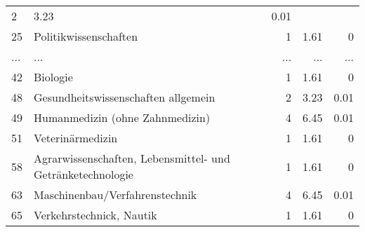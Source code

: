 \begin{longtable}{lXrrr}
          \num{2} &
          \num[round-mode=places,round-precision=2]{3,23} &
          \num[round-mode=places,round-precision=2]{0,01} \\
        25 & \multicolumn{1}{X}{Politikwissenschaften} & %
          \num{1} &
          \num[round-mode=places,round-precision=2]{1,61} &
          \num[round-mode=places,round-precision=2]{0} \\
       ... & ... & ... & ... & ... \\
        42 & \multicolumn{1}{X}{Biologie} & %
          \num{1} &
          \num[round-mode=places,round-precision=2]{1,61} &
          \num[round-mode=places,round-precision=2]{0} \\

        48 & \multicolumn{1}{X}{Gesundheitswissenschaften allgemein} & %
          \num{2} &
          \num[round-mode=places,round-precision=2]{3,23} &
          \num[round-mode=places,round-precision=2]{0,01} \\

        49 & \multicolumn{1}{X}{Humanmedizin (ohne Zahnmedizin)} & %
          \num{4} &
          \num[round-mode=places,round-precision=2]{6,45} &
          \num[round-mode=places,round-precision=2]{0,01} \\

        51 & \multicolumn{1}{X}{Veterinärmedizin} & %
          \num{1} &
          \num[round-mode=places,round-precision=2]{1,61} &
          \num[round-mode=places,round-precision=2]{0} \\

        58 & \multicolumn{1}{X}{Agrarwissenschaften, Lebensmittel- und Getränketechnologie} & %
          \num{1} &
          \num[round-mode=places,round-precision=2]{1,61} &
          \num[round-mode=places,round-precision=2]{0} \\

        63 & \multicolumn{1}{X}{Maschinenbau/Verfahrenstechnik} & %
          \num{4} &
          \num[round-mode=places,round-precision=2]{6,45} &
          \num[round-mode=places,round-precision=2]{0,01} \\

        65 & \multicolumn{1}{X}{Verkehrstechnick, Nautik} & %
          \num{1} &
          \num[round-mode=places,round-precision=2]{1,61} &
          \num[round-mode=places,round-precision=2]{0} \\


\end{longtable}
